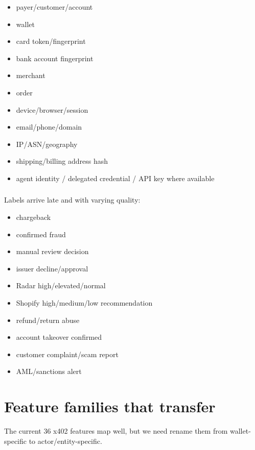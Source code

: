 \documentclass[11pt]{article}
\begin{document}
\begin{itemize}
  \item payer/customer/account
  \item wallet
  \item card token/fingerprint
  \item bank account fingerprint
  \item merchant
  \item order
  \item device/browser/session
  \item email/phone/domain
  \item IP/ASN/geography
  \item shipping/billing address hash
  \item agent identity / delegated credential / API key where available
\end{itemize}
\subsubsection*{}
Labels arrive late and with varying quality:

\begin{itemize}
  \item chargeback
  \item confirmed fraud
  \item manual review decision
  \item issuer decline/approval
  \item Radar high/elevated/normal
  \item Shopify high/medium/low recommendation
  \item refund/return abuse
  \item account takeover confirmed
  \item customer complaint/scam report
  \item AML/sanctions alert
\end{itemize}
\section{Feature families that transfer}
The current 36 x402 features map well, but we need rename them from wallet-specific to actor/entity-specific.
\end{document}
